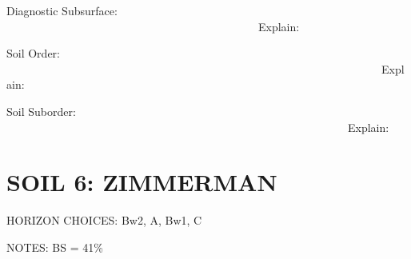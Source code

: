 \documentclass[
  letterpaper,
  twocolumn,
  portrait]{scrbook}
\begin{document}
Diagnostic Subsurface:
~~~~~~~~~~~~~~~~~~~~~~~~~~~~~~~~~~~~~~~~~~~~~Explain:

Soil Order:
~~~~~~~~~~~~~~~~~~~~~~~~~~~~~~~~~~~~~~~~~~~~~~~~~~~~~~~~~~~~~~~~~~~Explain:

Soil Suborder:
~~~~~~~~~~~~~~~~~~~~~~~~~~~~~~~~~~~~~~~~~~~~~~~~~~~~~~~~~~~~~Explain:

\hypertarget{soil-6-zimmerman}{%
\section{SOIL 6: ZIMMERMAN}\label{soil-6-zimmerman}}

HORIZON CHOICES: Bw2, A, Bw1, C

NOTES: BS = 41\%

 
  \providecommand{\huxb}[2]{\arrayrulecolor[RGB]{#1}\global\arrayrulewidth=#2pt}
  \providecommand{\huxvb}[2]{\color[RGB]{#1}\vrule width #2pt}
  \providecommand{\huxtpad}[1]{\rule{0pt}{#1}}
  \providecommand{\huxbpad}[1]{\rule[-#1]{0pt}{#1}}
\end{document}
